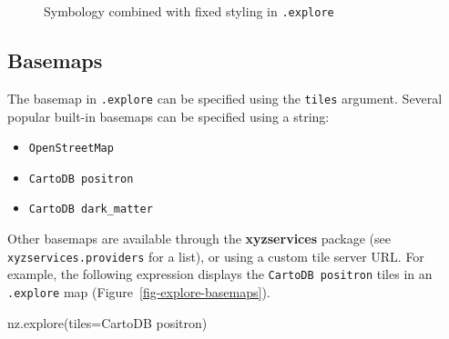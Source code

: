 \documentclass[
  letterpaper,
]{krantz}
\newenvironment{Shaded}{\begin{snugshade}}{\end{snugshade}}
\newcommand{\NormalTok}[1]{\textcolor[rgb]{0.00,0.23,0.31}{#1}}
\newcommand{\OperatorTok}[1]{\textcolor[rgb]{0.37,0.37,0.37}{#1}}
\newcommand{\StringTok}[1]{\textcolor[rgb]{0.13,0.47,0.30}{#1}}
\providecommand{\tightlist}{%
  \setlength{\itemsep}{0pt}\setlength{\parskip}{0pt}}\usepackage{longtable,booktabs,array}
\begin{document}
\begin{figure}


\caption{\label{fig-explore-symbology2}Symbology combined with fixed
styling in \texttt{.explore}}

\end{figure}%

\subsection{Basemaps}\label{basemaps-1}

The basemap in \texttt{.explore} can be specified using the
\texttt{tiles} argument. Several popular built-in basemaps can be
specified using a string:

\begin{itemize}
\tightlist
\item
  \texttt{\textquotesingle{}OpenStreetMap\textquotesingle{}}
\item
  \texttt{\textquotesingle{}CartoDB\ positron\textquotesingle{}}
\item
  \texttt{\textquotesingle{}CartoDB\ dark\_matter\textquotesingle{}}
\end{itemize}

Other basemaps are available through the \textbf{xyzservices} package
(see \texttt{xyzservices.providers} for a list), or using a custom tile
server URL. For example, the following expression displays the
\texttt{\textquotesingle{}CartoDB\ positron\textquotesingle{}} tiles in
an \texttt{.explore} map (Figure~\ref{fig-explore-basemaps}).

\begin{Shaded}
\begin{Highlighting}[]
\NormalTok{nz.explore(tiles}\OperatorTok{=}\StringTok{\textquotesingle{}CartoDB positron\textquotesingle{}}\NormalTok{)}
\end{Highlighting}
\end{Shaded}
\end{document}
